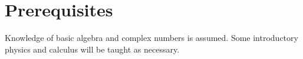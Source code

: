 \section{Prerequisites}

Knowledge of basic algebra and complex numbers is assumed. Some introductory
physics and calculus will be taught as necessary.
